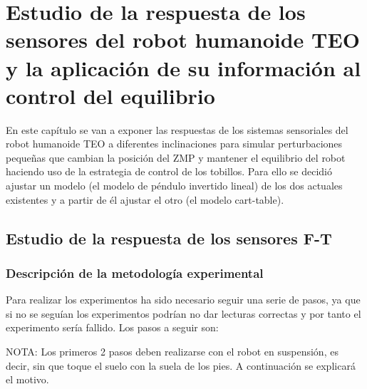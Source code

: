 \section{Estudio de la respuesta de los sensores del robot humanoide TEO y la aplicación de su información al control del equilibrio}

En este capítulo se van a exponer las respuestas de los sistemas sensoriales del robot humanoide TEO a diferentes inclinaciones  para simular perturbaciones pequeñas que cambian la posición del ZMP y mantener el equilibrio del robot haciendo uso de la estrategia de control de los tobillos. Para ello se decidió ajustar un modelo (el modelo de péndulo invertido lineal) de los dos actuales existentes y a partir de él ajustar el otro (el modelo cart-table).

\subsection{Estudio de la respuesta de los sensores F-T}

\subsubsection{Descripción de la metodología experimental}

Para realizar los experimentos ha sido necesario seguir una serie de pasos, ya que si no se seguían los experimentos podrían no dar lecturas correctas y por tanto el experimento sería fallido. Los pasos a seguir son:

NOTA: Los primeros 2 pasos deben realizarse con el robot en suspensión, es decir, sin que toque el suelo con la suela de los pies. A continuación se explicará el motivo.

